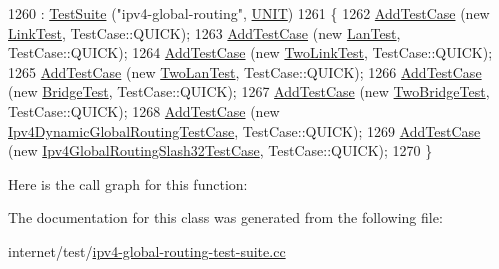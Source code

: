 \begin{DoxyCode}
1260   : \hyperlink{classns3_1_1TestSuite_a904b0c40583b744d30908aeb94636d1a}{TestSuite} (\textcolor{stringliteral}{"ipv4-global-routing"}, \hyperlink{classns3_1_1TestSuite_a1ebfcab34ec8161e085e8e3a1855eae0a3885375a3787abf60431f8454b3cadbd}{UNIT})
1261   \{
1262     \hyperlink{classns3_1_1TestCase_a3718088e3eefd5d6454569d2e0ddd835}{AddTestCase} (\textcolor{keyword}{new} \hyperlink{classLinkTest}{LinkTest}, TestCase::QUICK);
1263     \hyperlink{classns3_1_1TestCase_a3718088e3eefd5d6454569d2e0ddd835}{AddTestCase} (\textcolor{keyword}{new} \hyperlink{classLanTest}{LanTest}, TestCase::QUICK);
1264     \hyperlink{classns3_1_1TestCase_a3718088e3eefd5d6454569d2e0ddd835}{AddTestCase} (\textcolor{keyword}{new} \hyperlink{classTwoLinkTest}{TwoLinkTest}, TestCase::QUICK);
1265     \hyperlink{classns3_1_1TestCase_a3718088e3eefd5d6454569d2e0ddd835}{AddTestCase} (\textcolor{keyword}{new} \hyperlink{classTwoLanTest}{TwoLanTest}, TestCase::QUICK);
1266     \hyperlink{classns3_1_1TestCase_a3718088e3eefd5d6454569d2e0ddd835}{AddTestCase} (\textcolor{keyword}{new} \hyperlink{classBridgeTest}{BridgeTest}, TestCase::QUICK);
1267     \hyperlink{classns3_1_1TestCase_a3718088e3eefd5d6454569d2e0ddd835}{AddTestCase} (\textcolor{keyword}{new} \hyperlink{classTwoBridgeTest}{TwoBridgeTest}, TestCase::QUICK);
1268     \hyperlink{classns3_1_1TestCase_a3718088e3eefd5d6454569d2e0ddd835}{AddTestCase} (\textcolor{keyword}{new} \hyperlink{classIpv4DynamicGlobalRoutingTestCase}{Ipv4DynamicGlobalRoutingTestCase}, 
      TestCase::QUICK);
1269     \hyperlink{classns3_1_1TestCase_a3718088e3eefd5d6454569d2e0ddd835}{AddTestCase} (\textcolor{keyword}{new} \hyperlink{classIpv4GlobalRoutingSlash32TestCase}{Ipv4GlobalRoutingSlash32TestCase}, 
      TestCase::QUICK);
1270   \}
\end{DoxyCode}


Here is the call graph for this function\+:




The documentation for this class was generated from the following file\+:\begin{DoxyCompactItemize}
\item 
internet/test/\hyperlink{ipv4-global-routing-test-suite_8cc}{ipv4-\/global-\/routing-\/test-\/suite.\+cc}\end{DoxyCompactItemize}
